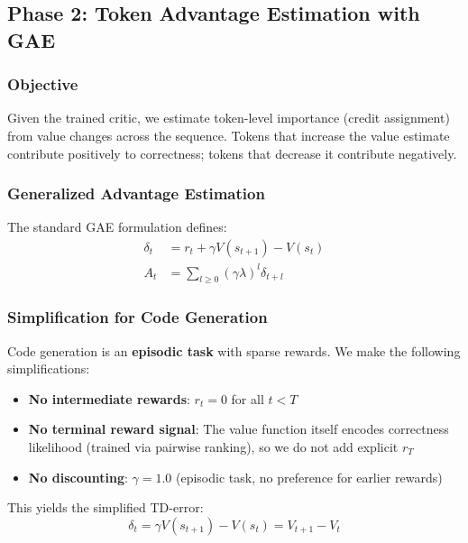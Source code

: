 \subsection{Phase 2: Token Advantage Estimation with GAE}

\subsubsection{Objective}

Given the trained critic, we estimate token-level importance (credit assignment) from value changes across the sequence. Tokens that increase the value estimate contribute positively to correctness; tokens that decrease it contribute negatively.

\subsubsection{Generalized Advantage Estimation}

The standard GAE formulation \citep{schulman2015high} defines:
\begin{align}
    \delta_t &= r_t + \gamma V(s_{t+1}) - V(s_t) \label{eq:td_error} \\
    A_t &= \sum_{l \geq 0} (\gamma \lambda)^l \delta_{t+l} \label{eq:gae}
\end{align}

\subsubsection{Simplification for Code Generation}

Code generation is an \textbf{episodic task} with sparse rewards. We make the following simplifications:

\begin{itemize}[nosep]
    \item \textbf{No intermediate rewards}: $r_t = 0$ for all $t < T$
    \item \textbf{No terminal reward signal}: The value function itself encodes correctness likelihood (trained via pairwise ranking), so we do not add explicit $r_T$
    \item \textbf{No discounting}: $\gamma = 1.0$ (episodic task, no preference for earlier rewards)
\end{itemize}

This yields the simplified TD-error:
\begin{equation}
    \delta_t = \gamma V(s_{t+1}) - V(s_t) = V_{t+1} - V_t
    \label{eq:simplified_td}
\end{equation}

